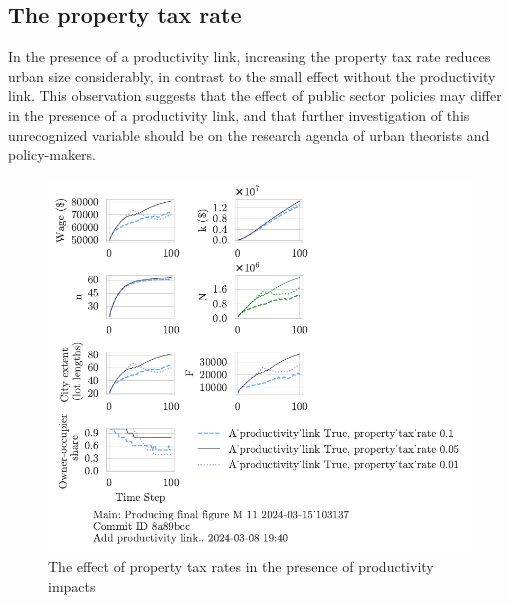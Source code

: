 \newpage
\subsection{The property tax rate}
In the presence of a productivity link, increasing the property tax rate reduces urban size considerably, in contrast to the small effect without the productivity link. This observation suggests that the effect of public sector policies may differ in the presence of a productivity link, and that further investigation of this unrecognized variable should be on the research agenda of urban theorists and policy-makers.

\begin{figure}[h!tb] 
    \centering
    \includegraphics[scale=1, trim={0 1.4cm 0 0},clip]{fig/With-productivity_link-property_tax-103137.pdf}  %
    \caption{The effect of property tax rates in the presence of productivity impacts}
    \label{fig:Productivity_link_and_property_tax_ownership_trajectory}
\end{figure}


